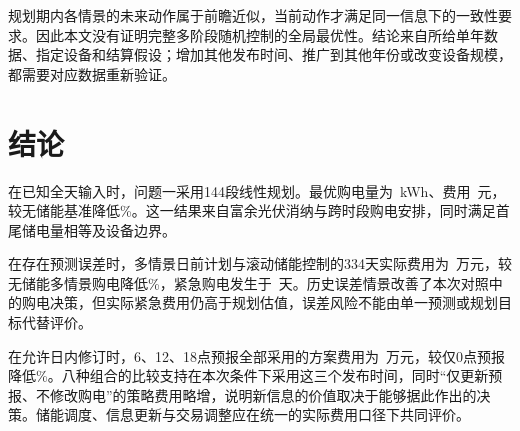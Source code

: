 规划期内各情景的未来动作属于前瞻近似，当前动作才满足同一信息下的一致性要求。因此本文没有证明完整多阶段随机控制的全局最优性。结论来自所给单年数据、指定设备和结算假设；增加其他发布时间、推广到其他年份或改变设备规模，都需要对应数据重新验证。

\section{结论}
在已知全天输入时，问题一采用144段线性规划。最优购电量为\QoneGrid\ kWh、费用\QoneCost\ 元，较无储能基准降低\SavingPercent\%。这一结果来自富余光伏消纳与跨时段购电安排，同时满足首尾储电量相等及设备边界。

在存在预测误差时，多情景日前计划与滚动储能控制的334天实际费用为\QtwoCost\ 万元，较无储能多情景购电降低\QtwoNoStorageSaving\%，紧急购电发生于\QtwoDays\ 天。历史误差情景改善了本次对照中的购电决策，但实际紧急费用仍高于规划估值，误差风险不能由单一预测或规划目标代替评价。

在允许日内修订时，6、12、18点预报全部采用的方案费用为\QthreeCost\ 万元，较仅0点预报降低\QthreeSaving\%。八种组合的比较支持在本次条件下采用这三个发布时间，同时“仅更新预报、不修改购电”的策略费用略增，说明新信息的价值取决于能够据此作出的决策。储能调度、信息更新与交易调整应在统一的实际费用口径下共同评价。
